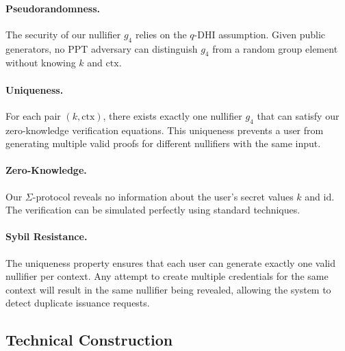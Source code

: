 \paragraph{Pseudorandomness.} The security of our nullifier $g_4$ relies on the $q$-DHI assumption. Given public generators, no PPT adversary can distinguish $g_4$ from a random group element without knowing $k$ and $\text{ctx}$.

\paragraph{Uniqueness.} For each pair $(k, \text{ctx})$, there exists exactly one nullifier $g_4$ that can satisfy our zero-knowledge verification equations. This uniqueness prevents a user from generating multiple valid proofs for different nullifiers with the same input.

\paragraph{Zero-Knowledge.} Our $\Sigma$-protocol reveals no information about the user's secret values $k$ and $\text{id}$. The verification can be simulated perfectly using standard techniques.

\paragraph{Sybil Resistance.} The uniqueness property ensures that each user can generate exactly one valid nullifier per context. Any attempt to create multiple credentials for the same context will result in the same nullifier being revealed, allowing the system to detect duplicate issuance requests.






































\subsection{Technical Construction}

